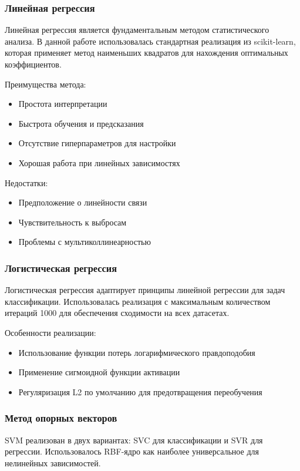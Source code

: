 \documentclass[a4paper]{article}
\begin{document}
\subsubsection{Линейная регрессия}
Линейная регрессия является фундаментальным методом статистического анализа. В данной работе использовалась стандартная реализация из scikit-learn, которая применяет метод наименьших квадратов для нахождения оптимальных коэффициентов. 

Преимущества метода:
\begin{itemize}
    \item Простота интерпретации
    \item Быстрота обучения и предсказания
    \item Отсутствие гиперпараметров для настройки
    \item Хорошая работа при линейных зависимостях
\end{itemize}

Недостатки:
\begin{itemize}
    \item Предположение о линейности связи
    \item Чувствительность к выбросам
    \item Проблемы с мультиколлинеарностью
\end{itemize}

\subsubsection{Логистическая регрессия}
Логистическая регрессия адаптирует принципы линейной регрессии для задач классификации. Использовалась реализация с максимальным количеством итераций 1000 для обеспечения сходимости на всех датасетах.

Особенности реализации:
\begin{itemize}
    \item Использование функции потерь логарифмического правдоподобия
    \item Применение сигмоидной функции активации
    \item Регуляризация L2 по умолчанию для предотвращения переобучения
\end{itemize}

\subsubsection{Метод опорных векторов}
SVM реализован в двух вариантах: SVC для классификации и SVR для регрессии. Использовалось RBF-ядро как наиболее универсальное для нелинейных зависимостей.
\end{document}
